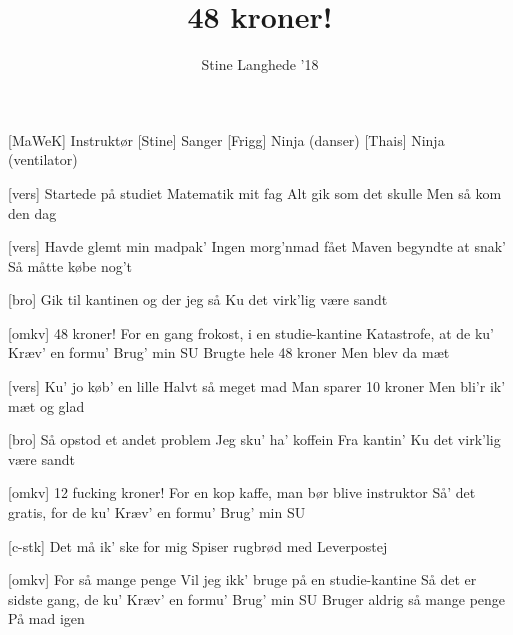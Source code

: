 \documentclass[a4paper,11pt]{article}
\title{48 kroner!}
\author{Stine Langhede '18}
\begin{document}
\maketitle

\begin{roles}
[MaWeK] Instruktør
[Stine] Sanger
[Frigg] Ninja (danser)
[Thais] Ninja (ventilator)
\end{roles}

\begin{props}
\end{props}


\begin{song}

[vers]%
Startede på studiet
Matematik mit fag
Alt gik som det skulle
Men så kom den dag

[vers]%
Havde glemt min madpak'
Ingen morg'nmad fået
Maven begyndte at snak'
Så måtte købe nog't

[bro]%
Gik til kantinen og der jeg så
Ku det virk'lig være sandt

[omkv]%
48 kroner!
For en gang frokost, i en studie-kantine
Katastrofe, at de ku'
Kræv' en formu'
Brug' min SU
Brugte hele 48 kroner
Men blev da mæt

[vers]%
Ku' jo køb' en lille
Halvt så meget mad
Man sparer 10 kroner
Men bli'r ik' mæt og glad

[bro]%
Så opstod et andet problem
Jeg sku' ha' koffein
Fra kantin'
Ku det virk'lig være sandt

[omkv]%
12 fucking kroner!
For en kop kaffe, man bør blive instruktor
Så' det gratis, for de ku'
Kræv' en formu'
Brug' min SU

[c-stk]%
Det må ik' ske for mig
Spiser rugbrød med
Leverpostej


[omkv]%
For så mange penge
Vil jeg ikk' bruge på en studie-kantine
Så det er sidste gang, de ku'
Kræv' en formu'
Brug' min SU
Bruger aldrig så mange penge
På mad igen
\end{song}
\end{document}
